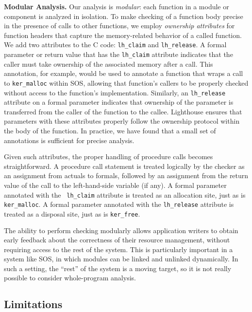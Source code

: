 \smallskip\noindent
%
{\bf Modular Analysis.}
%
Our analysis is {\em modular}:  each function in a module or component
is analyzed in isolation.  To make checking of a function body precise
in the presence of calls to other functions, we employ {\em ownership
attributes} for function headers that capture the memory-related
behavior of a called function.  We add two attributes to the C code:
{\tt lh\_claim} and {\tt lh\_release}.  A formal parameter or return
value that has the {\tt lh\_claim} attribute indicates that the caller
must take ownership of the associated memory after a call.  This
annotation, for example, would be used to annotate a function that
wraps a call to {\tt ker\_malloc} within SOS, allowing that function's
callers to be properly checked without access to the function's
implementation.  Similarly, an {\tt lh\_release} attribute on a formal
parameter indicates that ownership of the parameter is transferred
from the caller of the function to the callee.  
%
%
Lighthouse ensures that parameters with these attributes properly
follow the ownership protocol within the body of the function.
%
In practice, we have found that a small set of annotations is
sufficient for precise analysis.

Given such attributes, the proper handling of procedure calls becomes
straightforward.  A procedure call statement is treated logically by
the checker as an assignment from actuals to formals, followed by an
assignment from the return value of the call to the left-hand-side
variable (if any).  A formal parameter annotated with the {\tt
lh\_claim} attribute is treated as an allocation site, just as is {\tt
ker\_malloc}.  A formal parameter annotated with the {\tt lh\_release}
attribute is treated as a disposal site, just as is {\tt ker\_free}.

The ability to perform checking modularly allows application writers
to obtain early feedback about the correctness of their resource
management, without requiring access to the rest of the system.  This
is particularly important in a system like SOS, in which modules can
be linked and unlinked dynamically.  In such a setting, the ``rest''
of the system is a moving target, so it is not really possible to
consider whole-program analysis.



\subsection{Limitations}

